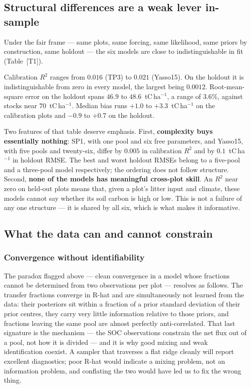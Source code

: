 \documentclass[11pt]{article}
\begin{document}
\subsection{Structural differences are a weak lever in-sample}
Under the fair frame --- same plots, same forcing, same likelihood, same
priors by construction, same holdout --- the six models are close to
indistinguishable in fit (Table~[T1]).

Calibration $R^2$ ranges from $0.016$ (TP3) to $0.021$ (Yasso15). On the
holdout it is indistinguishable from zero in every model, the largest being
$0.0012$. Root-mean-square error on the holdout spans $46.9$ to
$48.6$~tC\,ha$^{-1}$, a range of $3.6\%$, against stocks near
$70$~tC\,ha$^{-1}$. Median bias runs $+1.0$ to $+3.3$~tC\,ha$^{-1}$ on the
calibration plots and $-0.9$ to $+0.7$ on the holdout.

Two features of that table deserve emphasis. First, \textbf{complexity buys
essentially nothing}: SP1, with one pool and six free parameters, and Yasso15,
with five pools and twenty-six, differ by $0.005$ in calibration $R^2$ and by
$0.1$~tC\,ha$^{-1}$ in holdout RMSE. The best and worst holdout RMSEs belong to
a five-pool and a three-pool model respectively; the ordering does not follow
structure. Second, \textbf{none of the models has meaningful cross-plot skill}.
An $R^2$ near zero on held-out plots means that, given a plot's litter input and
climate, these models cannot say whether its soil carbon is high or low. This is
not a failure of any one structure --- it is shared by all six, which is what
makes it informative.

\subsection{What the data can and cannot constrain}\label{sec:identifiability}

\subsubsection{Convergence without identifiability}
The paradox flagged above --- clean convergence in a model whose fractions
cannot be determined from two observations per plot --- resolves as follows.
The transfer fractions converge in R-hat and are simultaneously not learned from
the data: their posteriors sit within a fraction of a prior standard deviation
of their prior centres, they carry very little information relative to those
priors, and fractions leaving the same pool are almost perfectly
anti-correlated. That last signature is the mechanism --- the SOC observations
constrain the net flux out of a pool, not how it is divided --- and it is why
good mixing and weak identification coexist. A sampler that traverses a flat
ridge cleanly will report excellent diagnostics; poor R-hat would indicate a
mixing problem, not an information problem, and conflating the two would have
led us to fix the wrong thing.
\end{document}
